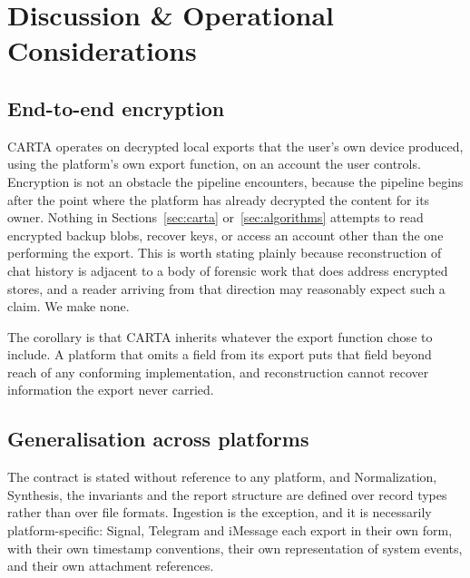 
\section{Discussion \& Operational Considerations}
\label{sec:discussion}

\subsection{End-to-end encryption}
\label{sec:discussion:encryption}

CARTA operates on decrypted local exports that the user's own device produced,
using the platform's own export function, on an account the user controls.
Encryption is not an obstacle the pipeline encounters, because the pipeline begins
after the point where the platform has already decrypted the content for its
owner. Nothing in Sections~\ref{sec:carta} or~\ref{sec:algorithms} attempts to
read encrypted backup blobs, recover keys, or access an account other than the one
performing the export. This is worth stating plainly because reconstruction of chat history is
adjacent to a body of forensic work that does address encrypted stores, and a
reader arriving from that direction may reasonably expect such a claim. We make
none.

The corollary is that CARTA inherits whatever the export function chose to
include. A platform that omits a field from its export puts that field beyond
reach of any conforming implementation, and reconstruction cannot recover
information the export never carried.

\subsection{Generalisation across platforms}
\label{sec:discussion:generalisation}

The contract \carta{} is stated without reference to any platform, and
Normalization, Synthesis, the invariants and the report structure are defined over
record types rather than over file formats. Ingestion is the exception, and it is
necessarily platform-specific: Signal, Telegram and iMessage each export in their
own form, with their own timestamp conventions, their own representation of system
events, and their own attachment references.

